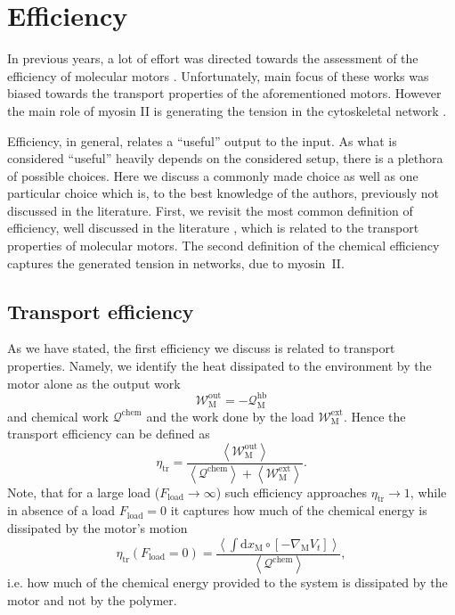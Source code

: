 \documentclass[aps,pre,twocolumn,showpacs,showkeys,superscriptaddress,floatfix]{revtex4-1}
\newcommand{\rmd}{{\mathrm d}}
\begin{document}
\section{Efficiency} 
\label{sec:efficiency}
In previous years, a lot of effort was directed towards the assessment of the efficiency of molecular motors \cite{Schmiedl2008,boksenbojm2009entropy,parmeggiani1999energy,parrondo1998efficiency,zhang2009efficiency}. 
Unfortunately, main focus of these works was biased towards the transport properties of the aforementioned motors. 
However the main role of myosin II is generating the tension in the cytoskeletal network \cite{ma2012nonmuscle,chugh2017actin,monier2010actomyosin}.

Efficiency, in general, relates a ``useful'' output to the input.
As what is considered ``useful'' heavily depends on the considered setup, there is a plethora of possible choices.
Here we discuss a commonly made choice as well as one particular choice which is, to the best knowledge of the authors, previously not discussed in the literature. 
First, we revisit the most common definition of efficiency, well discussed in the literature \cite{Schmiedl2008,boksenbojm2009entropy,parmeggiani1999energy,zhang2009efficiency}, which is related to the transport properties of molecular motors. 
The second definition of the chemical efficiency captures the generated tension in networks, due to myosin~II. 

\subsection{Transport efficiency} 
As we have stated, the first efficiency we discuss is related to transport properties. 
Namely, we identify the heat dissipated to the environment by the motor alone as the output work 
\[
{\mathcal W}^\text{out}_\text{M} = - {\mathcal Q}^\text{hb}_\text{M} 
\] 
and chemical work $\mathcal Q^\text{chem}$ and the work done by the load $\mathcal W^\text{ext}_\text{M}$.
Hence the transport efficiency can be defined as 
\[
\eta_\text{tr} = \frac{ \left\langle {\mathcal W}^\text{out}_\text{M} \right\rangle }{ \left\langle {\mathcal Q}^\text{chem} \right\rangle + \left\langle {\mathcal W}^\text{ext}_\text{M} \right\rangle } .
\]
Note, that for a large load ($F_\text{load} \to \infty$) such efficiency approaches $\eta_\text{tr} \to 1$, 
while in absence of a load $F_\text{load} = 0$ it captures how much of the chemical energy is dissipated by the motor's motion  
\[
\eta_\text{tr}( F_\text{load} = 0 ) = \frac{ \left\langle \int \rmd x_\text{M} \circ \left[ - \nabla_\text{M} V_t \right] \right\rangle }{ \left\langle {\mathcal Q}^\text{chem} \right\rangle } ,
\]
i.e. how much of the chemical energy provided to the system is dissipated by the motor and not by the polymer. 
\end{document}
